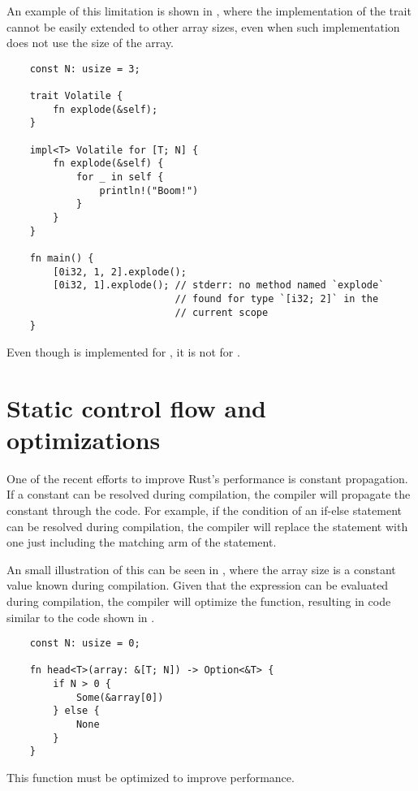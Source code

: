 An example of this limitation is shown in , where the
implementation of the trait  cannot be easily extended to
other array sizes, even when such implementation does not use the size of the
array. 

\begin{listing}
	\begin{verbatim} 
    const N: usize = 3;

    trait Volatile {
        fn explode(&self);
    }

    impl<T> Volatile for [T; N] {
        fn explode(&self) {
            for _ in self {
                println!("Boom!")
            }
        }
    }

    fn main() {
        [0i32, 1, 2].explode(); 
        [0i32, 1].explode(); // stderr: no method named `explode` 
                             // found for type `[i32; 2]` in the
                             // current scope
    }
	\end{verbatim}
    \caption{Even though  is implemented for \inrust{[T; 3]}, it is not for \inrust{[T; 2]}.}
  \label{lst:trait_array}
\end{listing}

\section{Static control flow and optimizations}
One of the recent efforts to improve Rust's performance is constant
propagation. If a constant can be resolved during compilation, the compiler
will propagate the constant through the code. For example, if the condition of
an if-else statement can be resolved during compilation, the compiler will
replace the statement with one just including the matching arm of the
statement.

An small illustration of this can be seen in ,
where the array size  is a constant value known during compilation.
Given that the expression   can be evaluated during compilation,
the compiler will optimize the function, resulting in code similar to the code
shown in .

\begin{listing}
    \begin{verbatim}
    const N: usize = 0;

    fn head<T>(array: &[T; N]) -> Option<&T> {
        if N > 0 {
            Some(&array[0])
        } else {
            None
        }
    }
    \end{verbatim}
    \caption{This function must be optimized to improve performance.}
    \label{lst:static_control_flow}
\end{listing}

